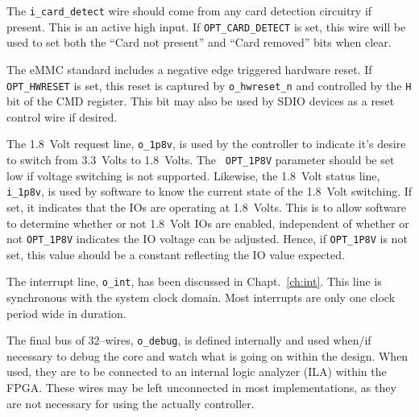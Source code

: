 \documentclass{gqtekspec}
\begin{document}
The {\tt i\_card\_detect} wire should come from any card detection circuitry
if present.  This is an active high input.  If {\tt OPT\_CARD\_DETECT} is
set, this wire will be used to set both the ``Card not present'' and ``Card
removed'' bits when clear.

The eMMC standard includes a negative edge triggered hardware reset.  If
{\tt OPT\_HWRESET} is set, this reset is captured by {\tt o\_hwreset\_n}
and controlled by the {\tt H} bit of the CMD register.  This bit may also
be used by SDIO devices as a reset control wire if desired.

The 1.8~Volt request line, {\tt o\_1p8v}, is used by the controller to
indicate it's desire to switch from 3.3~Volts to 1.8~Volts.  The {\tt
OPT\_1P8V} parameter should be set low if voltage switching is not supported.
Likewise, the 1.8~Volt status line, {\tt i\_1p8v}, is used by software to
know the current state of the 1.8~Volt switching.  If set, it indicates that
the IOs are operating at 1.8~Volts.  This is to allow software to determine
whether or not 1.8~Volt IOs are enabled, independent of whether or not
{\tt OPT\_1P8V} indicates the IO voltage can be adjusted.  Hence, if
{\tt OPT\_1P8V} is not set, this value should be a constant reflecting the
IO value expected.

The interrupt line, {\tt o\_int}, has been discussed in Chapt.~\ref{ch:int}.
This line is synchronous with the system clock domain.  Most interrupts are
only one clock period wide in duration.

The final bus of 32--wires, {\tt o\_debug}, is defined internally and used
when/if necessary to debug the core and watch what is going on within the
design.  When used, they are to be connected to an internal logic analyzer (ILA)
within the FPGA.  These wires may be left unconnected in most implementations,
as they are not necessary for using the actually controller.
\end{document}
